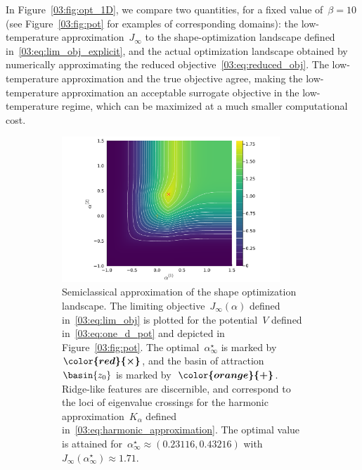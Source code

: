 In Figure~\ref{03:fig:opt_1D}, we compare two quantities, for a fixed value of~$\beta=10$ (see Figure~\ref{03:fig:pot} for examples of corresponding domains): the low-temperature approximation~$J_\infty$ to the shape-optimization landscape defined in~\eqref{03:eq:lim_obj_explicit}, and the actual optimization landscape obtained by numerically approximating the reduced objective~\eqref{03:eq:reduced_obj}.
The low-temperature approximation and the true objective agree, making the low-temperature approximation an acceptable surrogate objective in the low-temperature regime, which can be maximized at a much smaller computational cost.
\begin{figure}
    \centering
    \begin{subfigure}{0.9\textwidth}
    \includegraphics[width=0.9\textwidth]{figures/03/semiclassic/J_sc.pdf}
        \caption[]{Semiclassical approximation of the shape optimization landscape. The limiting objective~$J_\infty(\alpha)$ defined in~\eqref{03:eq:lim_obj} is plotted for the potential~$V$ defined in~\eqref{03:eq:one_d_pot} and depicted in Figure~\ref{03:fig:pot}. The optimal~$\alpha^\star_\infty$ is marked by~$\boldsymbol{\color{red}{\times}}$, and the basin of attraction~$\basin{z_0}$ is marked by~$\boldsymbol{\color{orange}{+}}$. Ridge-like features are discernible, and correspond to the loci of eigenvalue crossings for the harmonic approximation~$K_\alpha$ defined in~\eqref{03:eq:harmonic_approximation}. The optimal value is attained for~$\alpha^\star_{\infty}\approx(0.23116,0.43216)$ with~$J_\infty(\alpha^\star_\infty)\approx 1.71$.}
        \label{03:fig:shape_landscape_sc}
    \end{subfigure}
    \begin{subfigure}{0.9\textwidth}

\end{subfigure}
\end{figure}
